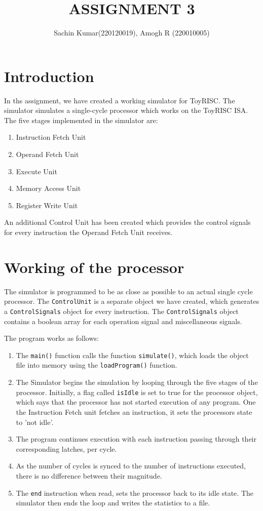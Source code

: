 \documentclass[12pt,a4paper]{article}
\title{\textbf{ASSIGNMENT 3}}
\author{Sachin Kumar(220120019), Amogh R (220010005)}
\date{}
\begin{document}
\maketitle

\section{Introduction}\label{sec:intro}
In ths assignment, we have created a working simulator for ToyRISC.
The simulator simulates a single-cycle processor which works on the ToyRISC ISA.
The five stages implemented in the simulator are:
\begin{enumerate}
    \item Instruction Fetch Unit
    \item Operand Fetch Unit
    \item Execute Unit
    \item Memory Access Unit
    \item Register Write Unit
\end{enumerate}
An additional Control Unit has been created which provides the control signals for every instruction the Operand Fetch Unit receives.

\section{Working of the processor}
The simulator is programmed to be as close as possible to an actual single cycle processor.
The \texttt{ControlUnit} is a separate object we have created, which generates a \texttt{ControlSignals} object for every instruction. The \texttt{ControlSignals} object contains a boolean array for each operation signal and miscellaneous signals.

The program works as follows:
\begin{enumerate}
    \item The \texttt{main()} function calls the function \texttt{simulate()}, which loads the object file into memory using the \texttt{loadProgram()} function.
    \item The Simulator begins the simulation by looping through the five stages of the processor. Initially, a flag called \texttt{isIdle} is set to true for the processor object, which says that the processor has not started execution of any program. One the Instruction Fetch unit fetches an instruction, it sets the processors state to 'not idle'.
    \item The program continues execution with each instruction passing through their corresponding latches, per cycle.
    \item As the number of cycles is synced to the number of instructions executed, there is no difference between their magnitude.
    \item The \texttt{end} instruction when read, sets the processor back to its idle state. The simulator then ends the loop and writes the statistics to a file.
\end{enumerate}
\end{document}
